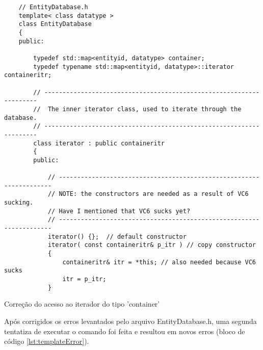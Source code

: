 \begin{listing}[!ht]
    \begin{verbatim}
    // EntityDatabase.h
    template< class datatype >
    class EntityDatabase
    {
    public:

        typedef std::map<entityid, datatype> container;
        typedef typename std::map<entityid, datatype>::iterator containeritr;

        // --------------------------------------------------------------------
        //  The inner iterator class, used to iterate through the database.
        // --------------------------------------------------------------------
        class iterator : public containeritr
        {
        public:

            // --------------------------------------------------------------------
            // NOTE: the constructors are needed as a result of VC6 sucking.
            // Have I mentioned that VC6 sucks yet?
            // --------------------------------------------------------------------
            iterator() {};  // default constructor
            iterator( const containeritr& p_itr ) // copy constructor
            {
                containeritr& itr = *this; // also needed because VC6 sucks
                itr = p_itr;
            }
    \end{verbatim}
\caption{Correção do acesso ao iterador do tipo 'container'}
\label{lst:containeritrFix}
\end{listing}


Após corrigidos os erros levantados pelo arquivo EntityDatabase.h, uma segunda tentatiza de 
executar o comando foi feita e resultou em novos erros (bloco de código \ref{lst:templateError}).

